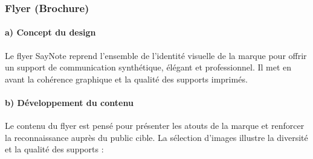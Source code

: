 \subsubsection{Flyer (Brochure)}
\paragraph*{a) Concept du design}
Le flyer SayNote reprend l’ensemble de l’identité visuelle de la marque pour offrir un support de communication synthétique, élégant et professionnel. Il met en avant la cohérence graphique et la qualité des supports imprimés.

\paragraph*{b) Développement du contenu}
Le contenu du flyer est pensé pour présenter les atouts de la marque et renforcer la reconnaissance auprès du public cible. La sélection d’images illustre la diversité et la qualité des supports :

